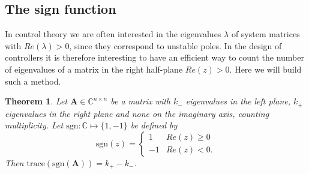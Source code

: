 \documentclass[11pt]{article}
\newtheorem{theorem}{Theorem}
\begin{document}
\subsection{The sign function}
In control theory we are often interested in the eigenvalues $\lambda$ of system matrices with $Re(\lambda)>0$, since they correspond to unstable poles. In the design of controllers it is therefore interesting to have an efficient way to count the number of eigenvalues of a matrix in the right half-plane $Re(z)>0$. Here we will build such a method.
\begin{theorem}\label{thm:sign}
Let $\mathbf{A}\in\mathbb{C}^{n \times n}$ be a matrix with $k_{-}$ eigenvalues in the left plane, $k_{+}$ eigenvalues in the right plane and none on the imaginary axis, counting multiplicity. Let $\text{sgn}:\mathbb{C}\mapsto \{1,-1\}$ be defined by
$$\text{sgn}(z)= \begin{cases} 
      1 & Re(z)\geq 0 \\
      -1 & Re(z)<0. 
   \end{cases}
$$
Then $\text{trace}(\text{sgn}(\mathbf{A}))=k_{+}-k_{-}$.
\end{theorem}
\end{document}
